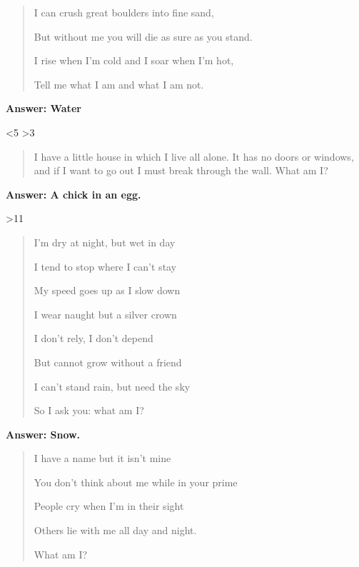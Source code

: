 \begin{multicols}{2}
{}

\begin{quotation}

I can crush great boulders into fine sand,

But without me you will die as sure as you stand.

I rise when I'm cold and I soar when I'm hot,

Tell me what I am and what I am not.

\end{quotation}

\textbf{Answer: Water}

\ifnum\month<5
  \ifnum\month>3
    \begin{quotation}
    
    I have a little house in which I live all alone.
    It has no doors or windows, and if I want to go out I must break through the wall.
    What am I?
    \end{quotation}
  
    \textbf{Answer: A chick in an egg.}
  \fi
\fi

\ifnum\month>11

  \begin{quotation}

  I'm dry at night, but wet in day

  I tend to stop where I can't stay

  My speed goes up as I slow down

  I wear naught but a silver crown

  I don't rely, I don't depend

  But cannot grow without a friend

  I can't stand rain, but need the sky

  So I ask you: what am I?

  \end{quotation}

  \textbf{Answer: Snow.}

\fi


\ifnum{}

  \begin{quotation}
    I have a name but it isn't mine

    You don't think about me while in your prime

    People cry when I'm in their sight

    Others lie with me all day and night.

    What am I?
  \end{quotation}


\end{multicols}

